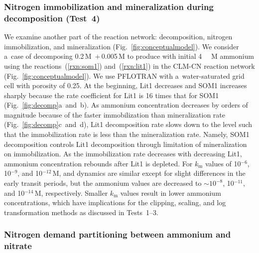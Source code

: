 \documentclass[gmdd, online, hvmath]{copernicus}
\begin{document}
\subsubsection{Nitrogen immobilization and mineralization during decomposition (Test~4)}%

      We examine another part of the reaction network: decomposition,
      nitrogen immobilization, and mineralization
      (Fig.~\ref{fig:conceptualmodel}). We consider a~case of decomposing
      0.2\,\unit{M} \,$+$\,0.005\,\unit{M}  to
      produce  with initial 4\,\unit{{\mu}\,M} ammonium using the
      reactions~(\ref{rxn:som1}) and~(\ref{rxn:lit1}) in the CLM-CN reaction
      network (Fig.~\ref{fig:conceptualmodel}). We use PFLOTRAN with
      a~water-saturated grid cell with porosity of 0.25. At the beginning,
      Lit1 decreases and SOM1 increases sharply because the rate coefficient
      for Lit1 is 16 times that for SOM1 (Fig.~\ref{fig:decomp}a~and~b). As
      ammonium concentration decreases by orders of magnitude because of the
      faster immobilization than mineralization rate
      (Fig.~\ref{fig:decomp}c~and~d), Lit1 decomposition rate slows down to
      the level such that the immobilization rate is less than the
      mineralization rate. Namely, SOM1 decomposition controls Lit1
      decomposition through limitation of mineralization on
      immobilization. As the immobilization rate decreases with decreasing
      Lit1, ammonium concentration rebounds after Lit1 is depleted. For
      $k_\mathrm{m}$ values of 10$^{-6}$, 10$^{-9}$, and 10$^{-12}$\,M,
       and  dynamics are similar except for slight
      differences in the early transit periods, but the ammonium values are
      decreased to $\sim 1 0^{-8}$, 10$^{-11}$, and 10$^{-14}$\,M,
      respectively. Smaller $k_\mathrm{m}$ values result in lower ammonium
      concentrations, which have implications for the clipping, scaling, and
      log transformation methods as discussed in Tests~1--3.


\subsubsection{Nitrogen demand partitioning between ammonium and nitrate}%
\end{document}
